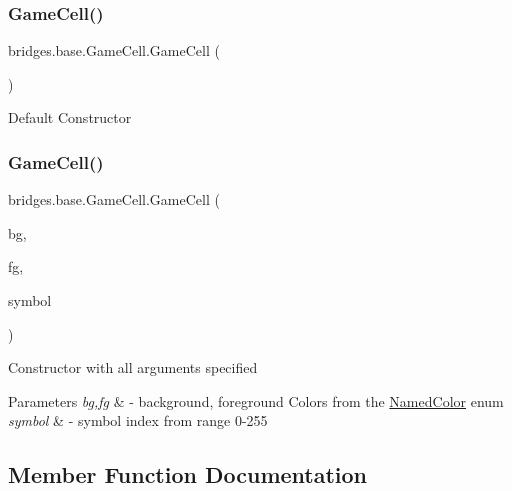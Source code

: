 \subsubsection{\texorpdfstring{Game\+Cell()}{GameCell()}\hspace{0.1cm}{\footnotesize\ttfamily [1/2]}}
{\footnotesize\ttfamily bridges.\+base.\+Game\+Cell.\+Game\+Cell (\begin{DoxyParamCaption}{ }\end{DoxyParamCaption})}

Default Constructor \mbox{\label{classbridges_1_1base_1_1_game_cell_aa8c18bc86d5595a6372dbdda66add0fd}} 
\subsubsection{\texorpdfstring{Game\+Cell()}{GameCell()}\hspace{0.1cm}{\footnotesize\ttfamily [2/2]}}
{\footnotesize\ttfamily bridges.\+base.\+Game\+Cell.\+Game\+Cell (\begin{DoxyParamCaption}\item[{\hyperlink{enumbridges_1_1base_1_1_named_color}{Named\+Color}}]{bg,  }\item[{\hyperlink{enumbridges_1_1base_1_1_named_color}{Named\+Color}}]{fg,  }\item[{\hyperlink{enumbridges_1_1base_1_1_named_symbol}{Named\+Symbol}}]{symbol }\end{DoxyParamCaption})}

Constructor with all arguments specified


\begin{DoxyParams}{Parameters}
{\em bg,fg} & -\/ background, foreground Colors from the \hyperlink{enumbridges_1_1base_1_1_named_color}{Named\+Color} enum \\
\hline
{\em symbol} & -\/ symbol index from range 0-\/255 \\
\hline
\end{DoxyParams}


\subsection{Member Function Documentation}
\mbox{\label{classbridges_1_1base_1_1_game_cell_ad431b73e9e0c9e4b0ab539468e8d3a58}} 
